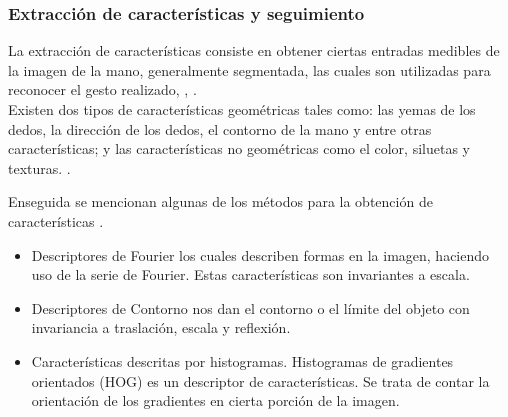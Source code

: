 \subsubsection{Extracción de características y seguimiento}\label{sssec:EtapaSeguimiento}  

La extracción de características consiste en obtener ciertas entradas medibles de la imagen de la mano, generalmente segmentada, las cuales son utilizadas para reconocer el gesto realizado, \citep{Premaratne2013}, \citep{Nayakwadi2014}.\\
Existen dos tipos de características geométricas tales como: las yemas de los dedos, la dirección de los dedos, el contorno de la mano y entre otras características; y las características no geométricas como el color, siluetas y texturas. \citep{Murthy2009}. 

Enseguida se mencionan algunas de los métodos para la obtención de características \citep{Premaratne2013}. 
\begin{itemize}
\item Descriptores de Fourier los cuales describen formas en la imagen, haciendo uso de la serie de Fourier. Estas características son invariantes a escala.
\item Descriptores de Contorno nos dan el contorno  o el límite del objeto con invariancia a traslación, escala  y reflexión.     
\item Características descritas por histogramas. Histogramas de gradientes orientados (HOG) es un descriptor de características. Se trata de contar la orientación de los gradientes en cierta porción de la imagen.  
\end{itemize}



